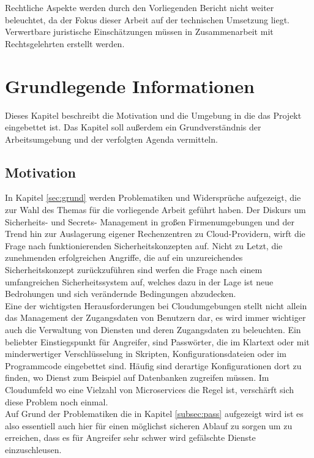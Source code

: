 \documentclass[
book,
a4paper,   
titlepage,  
halfparskip,
12pt        
]{scrartcl}
\begin{document}
\begin{onehalfspacing}
Rechtliche Aspekte werden durch den Vorliegenden Bericht nicht weiter beleuchtet, da der Fokus dieser Arbeit auf der technischen Umsetzung liegt. Verwertbare juristische Einschätzungen müssen in Zusammenarbeit mit Rechtsgelehrten erstellt werden.
\newpage

\section{Grundlegende Informationen}
\label{sec:inf}
Dieses Kapitel beschreibt die Motivation und die Umgebung in die das Projekt eingebettet ist. Das Kapitel soll außerdem ein Grundverständnis der Arbeitsumgebung und der verfolgten Agenda vermitteln.

\subsection{Motivation}
In Kapitel \vref{sec:grund} werden Problematiken und Widersprüche aufgezeigt, die zur Wahl des Themas für die vorliegende Arbeit geführt haben. Der Diskurs um Sicherheits- und Secrets- Management in großen Firmenumgebungen und der Trend hin zur Auslagerung eigener Rechenzentren zu Cloud-Providern, wirft die Frage nach funktionierenden Sicherheitskonzepten auf. Nicht zu Letzt, die zunehmenden erfolgreichen Angriffe, die auf ein unzureichendes Sicherheitskonzept zurückzuführen sind werfen die Frage nach einem umfangreichen Sicherheitssystem auf, welches dazu in der Lage ist neue Bedrohungen und sich verändernde Bedingungen abzudecken.\\
Eine der wichtigsten Herausforderungen bei Cloudumgebungen stellt nicht allein das Management der Zugangsdaten von Benutzern dar, es wird immer wichtiger auch die Verwaltung von Diensten und deren Zugangsdaten zu beleuchten. Ein beliebter Einstiegspunkt für Angreifer, sind Passwörter, die im Klartext oder mit minderwertiger Verschlüsselung in Skripten, Konfigurationsdateien oder im Programmcode eingebettet sind. Häufig sind derartige Konfigurationen dort zu finden, wo Dienst zum Beispiel auf Datenbanken zugreifen müssen. Im Cloudumfeld wo eine Vielzahl von Microservices die Regel ist, verschärft sich diese Problem noch einmal.\\
Auf Grund der Problematiken die in Kapitel \vref{subsec:pass} aufgezeigt wird ist es also essentiell auch hier für einen möglichst sicheren Ablauf zu sorgen um zu erreichen, dass es für Angreifer sehr schwer wird gefälschte Dienste einzuschleusen. 


\end{onehalfspacing}
\end{document}
